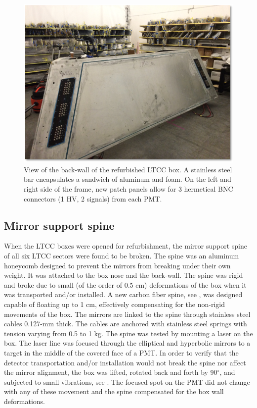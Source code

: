 \begin{figure}
	\centering
	\includegraphics[width=0.99\columnwidth,keepaspectratio]{img/backWall.png}
	\caption{View of the back-wall of the refurbished LTCC box. A stainless steel bar encapsulates a sandwich
             of aluminum and foam. On the left and right side of the frame, new patch panels allow for 3 hermetical
             BNC connectors (1 HV, 2 signals) from each PMT. }
	\label{fig:backWall}
\end{figure}


\subsection{Mirror support spine}

When the LTCC boxes were opened for refurbishment, the mirror support spine of all six LTCC sectors were found to be broken.
The spine was an aluminum honeycomb designed to prevent the mirrors from breaking under their own weight.
It was attached to the box nose and the back-wall. The spine was rigid and broke due to small
(of the order of 0.5 cm) deformations of the box when it was transported and/or installed.
A new carbon fiber spine, see , was designed capable of floating up to 1 cm, effectively compensating
for the non-rigid movements of the box.
The mirrors are linked to the spine through stainless steel cables 0.127-mm thick.
The cables are anchored with stainless steel springs with tension varying from 0.5 to 1 kg.
The spine was tested by mounting a laser on the box. The laser line was focused through the elliptical
and hyperbolic mirrors to a target in the middle of the covered face of a PMT.
In order to verify that the detector transportation and/or installation would not break the spine
nor affect the mirror alignment, the box was lifted, rotated back and forth by 90$^{\circ}$, and subjected
to small vibrations, see . The focused spot on the PMT did not change with any of these movement and the spine
compensated for the box wall deformations.

